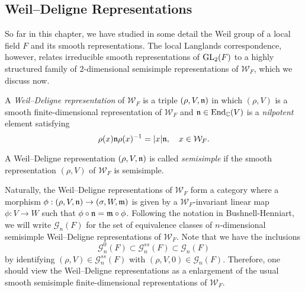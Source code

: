 \subsection{Weil--Deligne Representations}\label{sec:weildeligne}
So far in this chapter, we have studied in some detail the Weil group of a local field $F$ and its smooth representations. The local Langlands correspondence, however, relates irreducible smooth representations of $\mathrm{GL}_2(F)$ to a highly structured family of $2$-dimensional semisimple representations of $\mathcal{W}_F$, which we discuss now.

\begin{defn}\label{defn:WeilDeligne}
    A \textit{Weil--Deligne representation} of $\mathcal{W}_F$ is a triple $(\rho,V,\mathfrak{n})$ in which $(\rho,V)$ is a smooth finite-dimensional representation of $\mathcal{W}_F$ and $\mathfrak{n}\in\mathrm{End}_{\mathbb{C}}(V)$ is a \textit{nilpotent} element satisfying
    $$\rho(x)\mathfrak{n}\rho(x)^{-1}=|x|\mathfrak{n},\quad x\in \mathcal{W}_F.$$

    A Weil--Deligne representation $(\rho,V,\mathfrak{n})$ is called \textit{semisimple} if the smooth representation $(\rho,V)$ of $\mathcal{W}_F$ is semisimple.
\end{defn}

Naturally, the Weil--Deligne representations of $\mathcal{W}_F$ form a category where a morphism $\phi:(\rho,V,\mathfrak{n})\to(\sigma,W,\mathfrak{m})$ is given by a $\mathcal{W}_F$-invariant linear map $\phi:V\to W$ such that $\phi\circ\mathfrak{n}=\mathfrak{m}\circ\phi$. Following the notation in Bushnell-Henniart, we will write $\mathcal{G}_n(F)$ for the set of equivalence classes of $n$-dimensional semisimple Weil--Deligne representations of $\mathcal{W}_F$. Note that we have the inclusions
$$\mathcal{G}^{0}_n(F)\subset\mathcal{G}_n^{ss}(F)\subset\mathcal{G}_n(F)$$
by identifying $(\rho,V)\in\mathcal{G}_n^{ss}(F)$ with $(\rho,V,0)\in\mathcal{G}_n(F)$. Therefore, one should view the Weil--Deligne representations as a enlargement of the usual smooth semisimple finite-dimensional representations of $\mathcal{W}_F$. 

